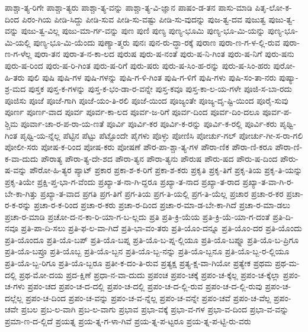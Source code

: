 {ಪಾಶ್ಚಾ-ತ್ಯ-ರಿಗೇ
ಪಾಶ್ಚಾ-ತ್ಯರು
ಪಾಶ್ಚಾ-ತ್ಯ-ವನ್ನು
ಪಾಶ್ಚಾ-ತ್ಯ-ವಿ-ಜ್ಞಾನ
ಪಾಷಂ-ಡ-ತನ
ಪಾಸು-ಮಾಡಿ
ಪಿತೃ-ಲೋ-ಕ-ದಿಂದ
ಪಿರಂ-ಗಿಯ
ಪೀಡಿ-ಸಿದ್ದು
ಪೀಡಿ-ಸುವ
ಪೀಡಿ-ಸು-ವಷ್ಟು
ಪೀಡಿ-ಸು-ವುದನ್ನು
ಪುಜ-ತ್ವ-ದವ
ಪುಜುತ್ವ
ಪುಜು-ತ್ವ-ವನ್ನು
ಪುಜು-ತ್ವ-ವಿಲ್ಲ
ಪುಜು-ಮಾ-ರ್ಗ-ವನ್ನು
ಪುಣ
ಪುಣಿ
ಪುಣ್ಯ
ಪುಣ್ಯ-ಭೂಮಿ
ಪುಣ್ಯ-ಭೂ-ಮಿ-ಯನ್ನು
ಪುಣ್ಯ-ಭೂ-ಮಿ-ಯಲ್ಲಿ
ಪುಣ್ಯ-ಭೂ-ಮಿ-ಯೆಂದು
ಪುಣ್ಯಾ-ತ್ಮರು
ಪುನಃ
ಪುನ-ರು-ದ್ಧಾ-ರಕ್ಕೆ
ಪುರಾಣ
ಪುರಾ-ಣ-ಗ-ಳ-ಲ್ಲಿ-ರುವ
ಪುರಾ-ಣ-ಗ-ಳೆಲ್ಲ
ಪುರಾ-ತನ
ಪುರಾ-ತ-ನ-ಕಾ-ಲದ
ಪುರುಷ
ಪುರು-ಷ-ನಂತೆ
ಪುರು-ಷ-ನಿ-ಗಿಂತ
ಪುರು-ಷ-ನಿಗೆ
ಪುರು-ಷನು
ಪುರು-ಷ-ರಿಂದ
ಪುರು-ಷ-ರಿ-ಗಿಂತ
ಪುರು-ಷ-ರಿಗೆ
ಪುರು-ಷರು
ಪುರು-ಷ-ಸಿಂ-ಹ-ರನ್ನು
ಪುರು-ಷ-ಸಿಂ-ಹರು
ಪುರೋ-ಹಿ-ತರು
ಪುಲಿ
ಪುಷಿ
ಪುಷಿ-ಗಳ
ಪುಷಿ-ಗಳನ್ನು
ಪುಷಿ-ಗ-ಳಿ-ಗಿಂತ
ಪುಷಿ-ಗ-ಳಿಗೆ
ಪುಷಿ-ಗಳು
ಪುಷಿ-ಸಂ-ತಾ-ನರು
ಪುಷ್ಯಾ-ಶ್ರ-ಮದ
ಪುಸ್ತಕ
ಪುಸ್ತ-ಕ-ಗಳನ್ನು
ಪುಸ್ತ-ಕ-ಭಂ-ಡಾ-ರ-ವನ್ನೇ
ಪುಸ್ತ-ಕವೂ
ಪುಸ್ತ-ಕಾ-ಲ-ಯ-ಗಳೇ
ಪೂಜಿ-ಸ-ಬಾ-ರದು
ಪೂಜಿಸು
ಪೂಜೆ
ಪೂಜೆ-ಗಾಗಿ
ಪೂಜೆ-ಯಂ-ತಿ-ರಲಿ
ಪೂಜೆ-ಯಿಂದ
ಪೂಜ್ಯಂತೇ
ಪೂಜ್ಯ-ದೃ-ಷ್ಟಿ-ಯಿಂದ
ಪೂರೈ-ಸುವು
ಪೂರ್ಣ
ಪೂರ್ಣ-ವಾದ
ಪೂರ್ವ
ಪೂರ್ವ-ಕಾ-ಲದ
ಪೂರ್ವ-ಜ-ರಿಗೆ
ಪೂರ್ವ-ದಿಂದ
ಪೂರ್ವ-ದಿಂ-ದಲೂ
ಪೂರ್ವ-ಪ-ಶ್ಚಿಮ
ಪೂರ್ವಾ-ಚಾ-ರ-ಪ-ರಾ-ಯ-ಣತೆ
ಪೂರ್ವಿ
ಪೂರ್ವಿ-ಕರ
ಪೂರ್ವಿ-ಕ-ರನ್ನು
ಪೂರ್ವಿ-ಕ-ರಲ್ಲಿ
ಪೂರ್ವಿ-ಕರು
ಪೃಥ್ವಿ-ಗಿಂತ
ಪೃಥ್ವಿ-ಯ-ನ್ನೆಲ್ಲ
ಪೆಟ್ಟಿನ
ಪೆಟ್ಟು
ಪೆಟ್ಟೊಂದೇ
ಪೈಗಳು
ಪೊಳ್ಳು
ಪೋಣಿಸಿ
ಪೋರ್ಚು-ಗಲ್
ಪೋರ್ಚು-ಗೀ-ಸ-ರಾ-ಗಲಿ
ಪೋಲೀ-ಸರು
ಪೋಷ-ಕ-ರಿಂದ
ಪೋಷ-ಕರು
ಪೋಷಣೆ
ಪೌರ-ಪಾ-ಶ್ಚಾ-ತ್ಯ-ಗಳ
ಪೌರಾ-ಣಿಕ
ಪೌರಾ-ಣಿ-ಕರೂ
ಪೌರಾ-ಣಿ-ಕ-ವಾ-ದುದು
ಪೌರಾತ್ಯ
ಪೌರಾ-ತ್ಯ-ದೇ-ಶದ
ಪೌರಾ-ತ್ಯನ
ಪೌರಾ-ತ್ಯನು
ಪೌರುಷ
ಪೌರು-ಷದ
ಪೌರು-ಷ-ದಿಂದ
ಪೌರು-ಷ-ವನ್ನು
ಪೌರೋ-ಹಿ-ತ್ಯರ
ಪ್ಯಾಟ್
ಪ್ರಕಾರ
ಪ್ರಕಾ-ಶ-ಕ-ರಿಗೆ
ಪ್ರಕಾ-ಶ-ಕರು
ಪ್ರಕೃತಿ
ಪ್ರಕೃ-ತಿಗೆ
ಪ್ರಕೃ-ತಿಯ
ಪ್ರಕೃ-ತಿ-ಯನ್ನು
ಪ್ರಕೃ-ತಿಯೇ
ಪ್ರಕ್ಷಿ-ಪ್ತ-ಭಾ-ಗ-ವೆಂದು
ಪ್ರಖ್ಯಾ-ತ-ನಾ-ಗಿ-ದ್ದರೂ
ಪ್ರಖ್ಯಾ-ತ-ನಾದ
ಪ್ರಖ್ಯಾ-ತ-ರಾದ
ಪ್ರಖ್ಯಾ-ತ-ವಾ-ಗಿ-ರ-ಬೇ-ಕಾ-ಗಿತ್ತು
ಪ್ರಖ್ಯಾ-ತ-ವಾದ
ಪ್ರಗತಿ
ಪ್ರಗ-ತಿಗೆ
ಪ್ರಗ-ತಿಯ
ಪ್ರಗ-ತಿ-ಯಲ್ಲಿ
ಪ್ರಗ-ತಿ-ಯೆಲ್ಲ
ಪ್ರಚಾರ
ಪ್ರಚಾ-ರ-ಕರ
ಪ್ರಚಾ-ರ-ಕ-ರನ್ನು
ಪ್ರಚಾ-ರ-ಕ-ರಿಂದ
ಪ್ರಚಾ-ರ-ಕರು
ಪ್ರಚಾ-ರ-ದಿಂದ
ಪ್ರಚಾ-ರ-ಮಾ-ಡ-ಬೇ-ಕಾ-ಗಿದೆ
ಪ್ರಚಾ-ರ-ಮಾ-ಡಲು
ಪ್ರಚಾ-ರ-ಮಾಡಿ
ಪ್ರಚೋ-ದ-ನ-ಕಾ-ರಿ-ಯಾ-ಗ-ಬ-ಲ್ಲದು
ಪ್ರತಿ
ಪ್ರತಿ-ಕ್ರಿ-ಯೆಯ
ಪ್ರತಿ-ಕ್ರಿ-ಯೆ-ಯಾ-ಗ-ದಂತೆ
ಪ್ರತಿ-ದಿ-ನವೂ
ಪ್ರತಿ-ಪಾ-ದಿ-ಸಲು
ಪ್ರತಿ-ಫ-ಲ-ವಾ-ಗಿದೆ
ಪ್ರತಿ-ಭಾ-ವಂ-ತರು
ಪ್ರತಿ-ಯೊಂ-ದನ್ನೂ
ಪ್ರತಿ-ಯೊಂ-ದರ
ಪ್ರತಿ-ಯೊಂದು
ಪ್ರತಿ-ಯೊಂದೂ
ಪ್ರತಿ-ಯೊ-ಬಪ್
ಪ್ರತಿ-ಯೊ-ಬಪ್ನ
ಪ್ರತಿ-ಯೊ-ಬ-ಪ್ನ-ಲ್ಲಿಯೂ
ಪ್ರತಿ-ಯೊ-ಬಪ್ನೂ
ಪ್ರತಿ-ಯೊ-ಬ-ಪ್ರಿಗೂ
ಪ್ರತಿ-ಯೊ-ಬಪ್ರೂ
ಪ್ರತಿ-ಯೊಬ್ಬ
ಪ್ರತಿ-ಯೊ-ಬ್ಬನ
ಪ್ರತಿ-ಯೊ-ಬ್ಬ-ನನ್ನು
ಪ್ರತಿ-ಯೊ-ಬ್ಬನೂ
ಪ್ರತಿ-ಯೊ-ಬ್ಬ-ರ-ಲ್ಲಿಯೂ
ಪ್ರತಿ-ಯೊ-ಬ್ಬ-ರಿಗೂ
ಪ್ರತಿ-ಯೊ-ಬ್ಬರೂ
ಪ್ರತೀ-ಕ-ದಂ-ತಿ-ರುವ
ಪ್ರತ್ಯಕ್ಷ
ಪ್ರತ್ಯ-ಕ್ಷ-ವಾ-ಗಿಯೋ
ಪ್ರತ್ಯೇಕ
ಪ್ರಥಮ
ಪ್ರಥ-ಮ-ದಲ್ಲಿ
ಪ್ರಥ-ಮೋ-ದಯ
ಪ್ರದ-ಕ್ಷಿಣೆ
ಪ್ರಧಾ-ನ-ವಾ-ದುದು
ಪ್ರಪಂಚ
ಪ್ರಪಂ-ಚಕ್ಕೆ
ಪ್ರಪಂ-ಚ-ಕ್ಕೆಲ್ಲ
ಪ್ರಪಂ-ಚ-ಕ್ಕೆಲ್ಲಾ
ಪ್ರಪಂ-ಚ-ಗಳು
ಪ್ರಪಂ-ಚದ
ಪ್ರಪಂ-ಚ-ದ-ದಲ್ಲಿ
ಪ್ರಪಂ-ಚ-ದಲ್ಲಿ
ಪ್ರಪಂ-ಚ-ದ-ಲ್ಲಿ-ರುವ
ಪ್ರಪಂ-ಚ-ದ-ಲ್ಲಿ-ರುವು
ಪ್ರಪಂ-ಚ-ದಲ್ಲೆಲ್ಲ
ಪ್ರಪಂ-ಚ-ದಿಂದ
ಪ್ರಪಂ-ಚ-ವನ್ನು
ಪ್ರಪಂ-ಚ-ವ-ನ್ನೆಲ್ಲ
ಪ್ರಪಂ-ಚ-ವನ್ನೇ
ಪ್ರಪಂ-ಚವೆ
ಪ್ರಪಂ-ಚ-ವೆಲ್ಲ
ಪ್ರಪಂ-ಚವೇ
ಪ್ರಬಲ
ಪ್ರಬ-ಲ-ವಾಗಿ
ಪ್ರಬ-ಲ-ವಾಗು
ಪ್ರಭಾವ
ಪ್ರಭಾ-ವಕ್ಕೆ
ಪ್ರಭಾ-ವ-ಗಳ
ಪ್ರಭಾ-ವ-ದಿಂದ
ಪ್ರಭಾ-ವ-ವನ್ನು
ಪ್ರಮಾ-ಣ-ದ-ಲ್ಲಿದೆ
ಪ್ರಯತ್ನ
ಪ್ರಯ-ತ್ನ-ಗ-ಳಾ-ಗಿವೆ
ಪ್ರಯ-ತ್ನ-ಪ-ಟ್ಟರೂ
ಪ್ರಯ-ತ್ನ-ಪ-ಟ್ಟಿ-ರು-ವರು
}
